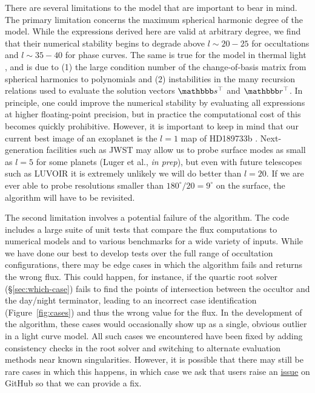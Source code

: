\documentclass[modern]{aastex62}
\begin{document}
There are several limitations to the \starry model that are important
to bear in mind. The primary limitation concerns the maximum spherical
harmonic degree of the model. While the expressions derived here are
valid at arbitrary degree, we find that their numerical stability begins
to degrade above $l \sim 20-25$ for occultations and $l \sim 35-40$ for phase
curves. The same is true for the model in thermal light \citep{Luger2019},
and is due to (1) the large condition number of the change-of-basis matrix
from spherical harmonics to polynomials and (2) instabilities in the
many recursion relations used to evaluate the solution vectors
$\sT$ and $\rT$.
In principle, one could improve the numerical stability by evaluating
all expressions at higher floating-point precision, but in practice
the computational cost of this becomes quickly prohibitive.
However, it is important to keep in mind that our current best image
of an exoplanet is the $l=1$ map of HD189733b
\citep{Knutson2007,Majeau2012,deWit2012}. Next-generation facilities
such as JWST may allow us to probe surface modes as small as $l=5$
for some planets (Luger et al., \emph{in prep}), but even with future
telescopes such as LUVOIR it is extremely unlikely we will do better than
$l=20$. If we are ever able to probe resolutions smaller than
$180^\circ / 20 = 9^\circ$ on the surface, the \starry algorithm
will have to be revisited.

The second limitation involves a potential failure of the \starry
algorithm. The \starry code includes a large suite of unit tests that compare
the flux computations to numerical models and to various benchmarks
for a wide variety of inputs. While we have done our best to
develop tests over the full range of occultation configurations,
there may be edge cases in which the \starry algorithm fails and returns
the wrong flux. This could happen, for instance, if the quartic root
solver (\S\ref{sec:which-case}) fails to find the points of intersection
between the occultor and the day/night terminator, leading to
an incorrect case identification (Figure~\ref{fig:cases}) and thus the
wrong value for the flux. In the development of the algorithm, these cases
would occasionally show up as a single, obvious outlier in a light curve
model. All such cases we encountered
have been fixed by adding consistency
checks in the root solver and switching to alternate evaluation methods
near known singularities. However, it is possible that there may still be
rare cases in which this happens, in which case we ask that users
raise an \href{https://github.com/rodluger/starry/issues}{issue} on
GitHub so that we can provide a fix.
\end{document}
